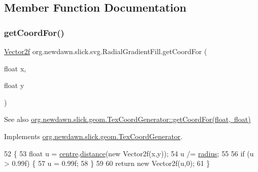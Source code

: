 \subsection{Member Function Documentation}
\mbox{\label{classorg_1_1newdawn_1_1slick_1_1svg_1_1_radial_gradient_fill_a5709cfc21a18fd1489d0d0a5efdf46bf}} 
\subsubsection{\texorpdfstring{get\+Coord\+For()}{getCoordFor()}}
{\footnotesize\ttfamily \mbox{\hyperlink{classorg_1_1newdawn_1_1slick_1_1geom_1_1_vector2f}{Vector2f}} org.\+newdawn.\+slick.\+svg.\+Radial\+Gradient\+Fill.\+get\+Coord\+For (\begin{DoxyParamCaption}\item[{float}]{x,  }\item[{float}]{y }\end{DoxyParamCaption})\hspace{0.3cm}{\ttfamily [inline]}}

\begin{DoxySeeAlso}{See also}
\mbox{\hyperlink{interfaceorg_1_1newdawn_1_1slick_1_1geom_1_1_tex_coord_generator_a2a67773df4f90a0bcb3f65d5499919d7}{org.\+newdawn.\+slick.\+geom.\+Tex\+Coord\+Generator\+::get\+Coord\+For(float, float)}} 
\end{DoxySeeAlso}


Implements \mbox{\hyperlink{interfaceorg_1_1newdawn_1_1slick_1_1geom_1_1_tex_coord_generator_a2a67773df4f90a0bcb3f65d5499919d7}{org.\+newdawn.\+slick.\+geom.\+Tex\+Coord\+Generator}}.


\begin{DoxyCode}
52                                                   \{
53         \textcolor{keywordtype}{float} u = \mbox{\hyperlink{classorg_1_1newdawn_1_1slick_1_1svg_1_1_radial_gradient_fill_a1ce1146036d333abb455c94451b2649d}{centre}}.\mbox{\hyperlink{classorg_1_1newdawn_1_1slick_1_1geom_1_1_vector2f_a0c78cd993e1ccefe024b695381fabb5c}{distance}}(\textcolor{keyword}{new} Vector2f(x,y));
54         u /= \mbox{\hyperlink{classorg_1_1newdawn_1_1slick_1_1svg_1_1_radial_gradient_fill_ad4815b0655b2098a41b293439bc83bd6}{radius}};
55         
56         \textcolor{keywordflow}{if} (u > 0.99f) \{
57             u = 0.99f;
58         \}
59         
60         \textcolor{keywordflow}{return} \textcolor{keyword}{new} Vector2f(u,0);
61     \}
\end{DoxyCode}


